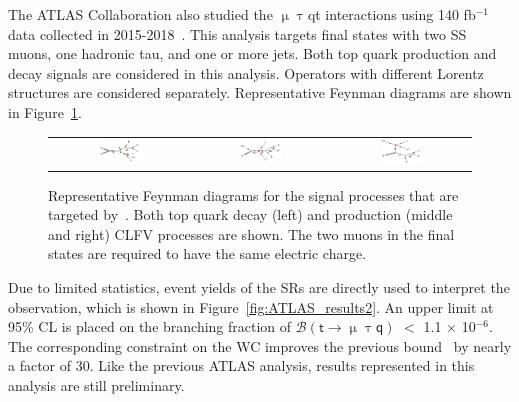 The \ac{ATLAS} Collaboration also studied the $\upmu\uptau$qt interactions using 140 fb$^{-1}$ data collected in 2015-2018~\cite{ATLAS-CONF-2023-001}. This analysis targets final states with two \ac{SS} muons, one hadronic tau, and one or more jets. Both top quark production and decay signals are considered in this analysis. Operators with different Lorentz structures are considered separately. Representative Feynman diagrams are shown in Figure~\ref{fig:ATLAS_FD}. 

\begin{figure}[tbh!]
 \begin{center}
 \begin{tabular}{ccc}
 \includegraphics[width=0.31\textwidth]{figures/Part3/History/ATLAS_TT}&
 \includegraphics[width=0.33\textwidth]{figures/Part3/History/ATLAS_ST1}&
 \includegraphics[width=0.31\textwidth]{figures/Part3/History/ATLAS_ST2}\\
 \end{tabular}
 \caption{Representative Feynman diagrams for the signal processes that are targeted by~\cite{ATLAS-CONF-2023-001}. Both top quark decay (left) and production (middle and right) \ac{CLFV} processes are shown. The two muons in the final states are required to have the same electric charge.}
 \label{fig:ATLAS_FD}
 \end{center}
\end{figure}

Due to limited statistics, event yields of the \acp{SR} are directly used to interpret the observation, which is shown in Figure~\ref{fig:ATLAS_results2}. An upper limit at 95\% \ac{CL} is placed on the branching fraction of $\mathcal{B}(\textsf{t}\rightarrow\upmu\uptau\textsf{q})$ $<$ 1.1 $\times$ 10$^{-6}$. The corresponding constraint on the \ac{WC} improves the previous bound~\cite{Chala:2018agk} by nearly a factor of 30. Like the previous \ac{ATLAS} analysis, results represented in this analysis are still preliminary.


